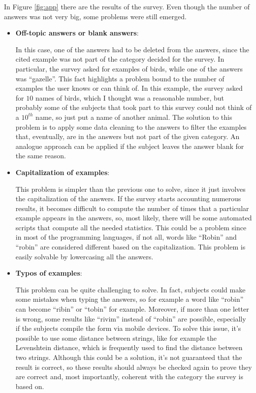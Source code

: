 \documentclass[conference]{IEEEtran}
\begin{document}
		\noindent In Figure \ref{fig:app} there are the results of the survey. Even though the number of answers was not very big, some problems were still emerged.
		\begin{itemize}
		
			\item \textbf{Off-topic answers or blank answers}:
				
				\noindent In this case, one of the answers had to be deleted from the answers, since the cited example was not part of the category decided for the survey. In particular, the survey asked for examples of birds, 
				while one of the answers was ``gazelle''. This fact highlights a problem bound to the number of examples the user knows or can think of. In this example, the survey asked for $10$ names of birds,
				which I thought was a reasonable number, but probably some of the subjects that took part to this survey could not think of a $10^{th}$ name, so just put a name of another animal. The solution 
				to this problem is to apply some data cleaning to the answers to filter the examples that, eventually, are in the answers but not part of the given category. An analogue approach can be applied if the 
				subject leaves the answer blank for the same reason.
			
			\item \textbf{Capitalization of examples}:
			
				\noindent This problem is simpler than the previous one to solve, since it just involves the capitalization of the answers. If the survey starts accounting numerous results, it becomes difficult to 
				compute the number of times that a particular example appears in the answers, so, most likely, there will be some automated scripts that compute all the needed statistics. This could be a problem since 
				in most of the programming languages, if not all, words like ``Robin'' and ``robin'' are considered different based on the capitalization. This problem is easily solvable by lowercasing all the 
				answers.
				
			\item \textbf{Typos of examples}:
				
				\noindent This problem can be quite challenging to solve. In fact, subjects could make some mistakes when typing the answers, so for example a word like ``robin'' can become ``ribin'' or ``tobin'' for example. 
				Moreover, if more than one letter is wrong, some results like ``rivim'' instead of ``robin'' are possible, especially if the subjects compile the form via mobile devices. To solve this issue, 
				it's possible to use some distance between strings, like for example the Levenshtein distance, which is frequently used to find the distance between two strings. Although this could be a solution,
				it's not guaranteed that the result is correct, so these results should always be checked again to prove they are correct and, most importantly, coherent with the category the survey is based on.
				

\end{itemize}
\end{document}
